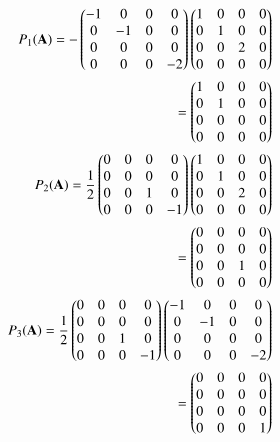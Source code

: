 \documentclass[journal,12pt,twocolumn]{IEEEtran}
\begin{document}
\begin{enumerate}
{\begin{align}
P_1(\mathbf{A})=-\begin{pmatrix}-1&0&0&0\\0&-1&0&0\\0&0&0&0\\0&0&0&-2\end{pmatrix}\begin{pmatrix}1&0&0&0\\0&1&0&0\\0&0&2&0\\0&0&0&0\end{pmatrix}\\=\begin{pmatrix}1&0&0&0\\0&1&0&0\\0&0&0&0\\0&0&0&0\end{pmatrix}\\
P_2(\mathbf{A})=\frac{1}{2}\begin{pmatrix}0&0&0&0\\0&0&0&0\\0&0&1&0\\0&0&0&-1\end{pmatrix}\begin{pmatrix}1&0&0&0\\0&1&0&0\\0&0&2&0\\0&0&0&0\end{pmatrix}\\=\begin{pmatrix}0&0&0&0\\0&0&0&0\\0&0&1&0\\0&0&0&0\end{pmatrix}\\
P_3(\mathbf{A})=\frac{1}{2}\begin{pmatrix}0&0&0&0\\0&0&0&0\\0&0&1&0\\0&0&0&-1\end{pmatrix}\begin{pmatrix}-1&0&0&0\\0&-1&0&0\\0&0&0&0\\0&0&0&-2\end{pmatrix}\\=\begin{pmatrix}0&0&0&0\\0&0&0&0\\0&0&0&0\\0&0&0&1\end{pmatrix}
\end{align}}
\end{enumerate}
\end{document}
